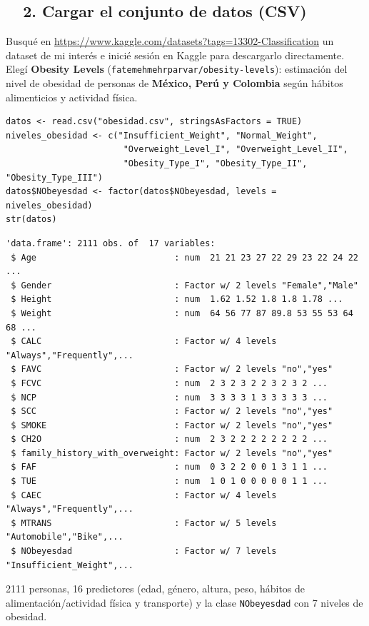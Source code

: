 \documentclass[11pt,a4paper]{article}
\begin{document}
\subsection{\faFileImport\ \ 2. Cargar el conjunto de datos (CSV)}
Busqué en \url{https://www.kaggle.com/datasets?tags=13302-Classification} un dataset de mi interés e inicié sesión en Kaggle para descargarlo directamente. Elegí \textbf{Obesity Levels} (\texttt{fatemehmehrparvar/obesity-levels}): estimación del nivel de obesidad de personas de \textbf{México, Perú y Colombia} según hábitos alimenticios y actividad física.
\begin{lstlisting}[style=styleR]
datos <- read.csv("obesidad.csv", stringsAsFactors = TRUE)
niveles_obesidad <- c("Insufficient_Weight", "Normal_Weight",
                       "Overweight_Level_I", "Overweight_Level_II",
                       "Obesity_Type_I", "Obesity_Type_II", "Obesity_Type_III")
datos$NObeyesdad <- factor(datos$NObeyesdad, levels = niveles_obesidad)
str(datos)
\end{lstlisting}
\begin{lstlisting}[style=styleOut]
'data.frame': 2111 obs. of  17 variables:
 $ Age                           : num  21 21 23 27 22 29 23 22 24 22 ...
 $ Gender                        : Factor w/ 2 levels "Female","Male"
 $ Height                        : num  1.62 1.52 1.8 1.8 1.78 ...
 $ Weight                        : num  64 56 77 87 89.8 53 55 53 64 68 ...
 $ CALC                          : Factor w/ 4 levels "Always","Frequently",...
 $ FAVC                          : Factor w/ 2 levels "no","yes"
 $ FCVC                          : num  2 3 2 3 2 2 3 2 3 2 ...
 $ NCP                           : num  3 3 3 3 1 3 3 3 3 3 ...
 $ SCC                           : Factor w/ 2 levels "no","yes"
 $ SMOKE                         : Factor w/ 2 levels "no","yes"
 $ CH2O                          : num  2 3 2 2 2 2 2 2 2 2 ...
 $ family_history_with_overweight: Factor w/ 2 levels "no","yes"
 $ FAF                           : num  0 3 2 2 0 0 1 3 1 1 ...
 $ TUE                           : num  1 0 1 0 0 0 0 0 1 1 ...
 $ CAEC                          : Factor w/ 4 levels "Always","Frequently",...
 $ MTRANS                        : Factor w/ 5 levels "Automobile","Bike",...
 $ NObeyesdad                    : Factor w/ 7 levels "Insufficient_Weight",...
\end{lstlisting}
2111 personas, 16 predictores (edad, género, altura, peso, hábitos de alimentación/actividad física y transporte) y la clase \texttt{NObeyesdad} con 7 niveles de obesidad.
\end{document}
